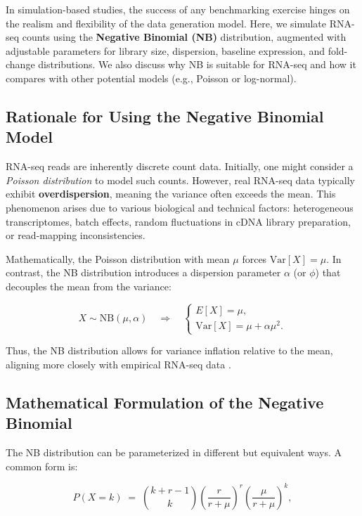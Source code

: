 \documentclass[12pt]{article}
\begin{document}
In simulation-based studies, the success of any benchmarking exercise hinges on the realism and flexibility of the data generation model. Here, we simulate RNA-seq counts using the \textbf{Negative Binomial (NB)} distribution, augmented with adjustable parameters for library size, dispersion, baseline expression, and fold-change distributions. We also discuss why NB is suitable for RNA-seq and how it compares with other potential models (e.g., Poisson or log-normal).

\subsection{Rationale for Using the Negative Binomial Model}
RNA-seq reads are inherently discrete count data. Initially, one might consider a \emph{Poisson distribution} to model such counts. However, real RNA-seq data typically exhibit \textbf{overdispersion}, meaning the variance often exceeds the mean. This phenomenon arises due to various biological and technical factors: heterogeneous transcriptomes, batch effects, random fluctuations in cDNA library preparation, or read-mapping inconsistencies. 

Mathematically, the Poisson distribution with mean $\mu$ forces $\text{Var}[X] = \mu$. In contrast, the NB distribution introduces a dispersion parameter $\alpha$ (or $\phi$) that decouples the mean from the variance:

\begin{equation}
X \sim \text{NB}(\mu, \alpha) \quad \Longrightarrow \quad 
\begin{cases}
E[X] = \mu, \\
\text{Var}[X] = \mu + \alpha \mu^2.
\end{cases}
\end{equation}

Thus, the NB distribution allows for variance inflation relative to the mean, aligning more closely with empirical RNA-seq data .

\subsection{Mathematical Formulation of the Negative Binomial}
The NB distribution can be parameterized in different but equivalent ways. A common form is:

\begin{equation}
\label{eq:nb_pmf}
P(X = k) \;=\; \binom{k + r - 1}{k} \left(\frac{r}{r + \mu}\right)^{r} 
\left(\frac{\mu}{r + \mu}\right)^{k}, 
\end{equation}
\end{document}
